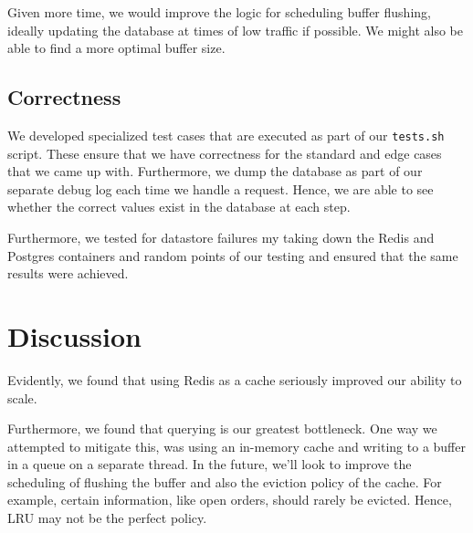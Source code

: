 \documentclass[titlepage, 11pt]{article}
\newcommand\0{\mathbf{0}}
\newcommand\<{\langle}
\renewcommand\>{\rangle}
\begin{document}
Given more time, we would improve the logic for scheduling buffer flushing, ideally updating the database at times of low traffic if possible. We might also be able to find a more optimal buffer size.

\subsection{Correctness}

We developed specialized test cases that are executed as part of our \texttt{tests.sh} script. These ensure that we have correctness for the standard and edge cases that we came up with. Furthermore, we dump the database as part of our separate debug log each time we handle a request. Hence, we are able to see whether the correct values exist in the database at each step.

Furthermore, we tested for datastore failures my taking down the Redis and Postgres containers and random points of our testing and ensured that the same results were achieved.

\section{Discussion}

Evidently, we found that using Redis as a cache seriously improved our ability to scale.

Furthermore, we found that querying is our greatest bottleneck. One way we attempted to mitigate this, was using an in-memory cache and writing to a buffer in a queue on a separate thread. In the future, we'll look to improve the scheduling of flushing the buffer and also the eviction policy of the cache. For example, certain information, like open orders, should rarely be evicted. Hence, LRU may not be the perfect policy.
\end{document}
